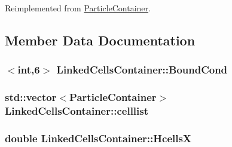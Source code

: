 Reimplemented from \hyperlink{classParticleContainer_ae132e846bb2763712d4acca3095bcbfc}{Particle\+Container}.



\subsection{Member Data Documentation}
\subsubsection[{\texorpdfstring{Bound\+Cond}{BoundCond}}]{$<$int,6$>$ Linked\+Cells\+Container\+::\+Bound\+Cond\hspace{0.3cm}{\ttfamily [private]}}\hypertarget{classLinkedCellsContainer_a0f3e5cc44b3f152a4199c54e43b40d57}{}\label{classLinkedCellsContainer_a0f3e5cc44b3f152a4199c54e43b40d57}
\subsubsection[{\texorpdfstring{celllist}{celllist}}]{\setlength{\rightskip}{0pt plus 5cm}std\+::vector$<${\bf Particle\+Container}$>$ Linked\+Cells\+Container\+::celllist\hspace{0.3cm}{\ttfamily [private]}}\hypertarget{classLinkedCellsContainer_a71ab828ce5a0300256ce9d263dd03b71}{}\label{classLinkedCellsContainer_a71ab828ce5a0300256ce9d263dd03b71}
\subsubsection[{\texorpdfstring{HcellsX}{HcellsX}}]{\setlength{\rightskip}{0pt plus 5cm}double Linked\+Cells\+Container\+::\+HcellsX\hspace{0.3cm}{\ttfamily [private]}}\hypertarget{classLinkedCellsContainer_a6bf86e59ebe06054d1d118db261c2069}{}\label{classLinkedCellsContainer_a6bf86e59ebe06054d1d118db261c2069}

